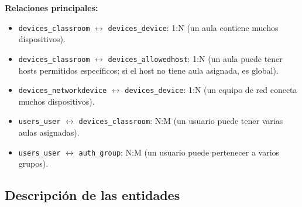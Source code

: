 \documentclass[12pt, a4paper, twoside]{article}
\begin{document}
\textbf{Relaciones principales:}
\begin{itemize}
  \item \texttt{devices\_classroom} $\longleftrightarrow$ \texttt{devices\_device}: 1:N (un aula contiene muchos dispositivos).
  \item \texttt{devices\_classroom} $\longleftrightarrow$ \texttt{devices\_allowedhost}: 1:N (un aula puede tener hosts permitidos específicos; si el host no tiene aula asignada, es global).
  \item \texttt{devices\_networkdevice} $\longleftrightarrow$ \texttt{devices\_device}: 1:N (un equipo de red conecta muchos dispositivos).
  \item \texttt{users\_user} $\longleftrightarrow$ \texttt{devices\_classroom}: N:M (un usuario puede tener varias aulas asignadas).
  \item \texttt{users\_user} $\longleftrightarrow$ \texttt{auth\_group}: N:M (un usuario puede pertenecer a varios grupos).
\end{itemize}

\subsection{Descripción de las entidades}
\end{document}
